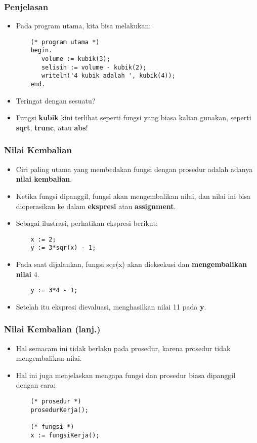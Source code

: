 \documentclass{beamer}
\begin{document}
\begin{frame}[fragile]
\frametitle{Penjelasan}
\begin{itemize}
	\item Pada program utama, kita bisa melakukan:
	\begin{lstlisting}
	(* program utama *)
	begin.
	   volume := kubik(3);
	   selisih := volume - kubik(2);
	   writeln('4 kubik adalah ', kubik(4));
	end.
	\end{lstlisting}
	\item Teringat dengan sesuatu?
	\item Fungsi \textbf{kubik} kini terlihat seperti fungsi yang biasa kalian gunakan, seperti \textbf{sqrt}, \textbf{trunc}, atau \textbf{abs}! 
\end{itemize}
\end{frame}

\begin{frame}[fragile]
\frametitle{Nilai Kembalian}
\begin{itemize}
	\item Ciri paling utama yang membedakan fungsi dengan prosedur adalah adanya \textbf{nilai kembalian}.
	\item Ketika fungsi dipanggil, fungsi akan mengembalikan nilai, dan nilai ini bisa dioperasikan ke dalam \textbf{ekspresi} atau \textbf{assignment}.
	\item Sebagai ilustrasi, perhatikan ekspresi berikut:
	\begin{lstlisting}
	x := 2;
	y := 3*sqr(x) - 1;
	\end{lstlisting}
	\item Pada saat dijalankan, fungsi sqr(x) akan dieksekusi dan \textbf{mengembalikan nilai} 4.
	\begin{lstlisting}
	y := 3*4 - 1;
	\end{lstlisting}
	\item Setelah itu ekspresi dievaluasi, menghasilkan nilai 11 pada \textbf{y}.
\end{itemize}
\end{frame}

\begin{frame}[fragile]
\frametitle{Nilai Kembalian (lanj.)}
\begin{itemize}
	\item Hal semacam ini tidak berlaku pada prosedur, karena prosedur tidak mengembalikan nilai.
	\item Hal ini juga menjelaskan mengapa fungsi dan prosedur biasa dipanggil dengan cara:
	\begin{lstlisting}
	(* prosedur *)
	prosedurKerja();
	
	(* fungsi *)
	x := fungsiKerja();
	\end{lstlisting}
\end{itemize}
\end{frame}
\end{document}
